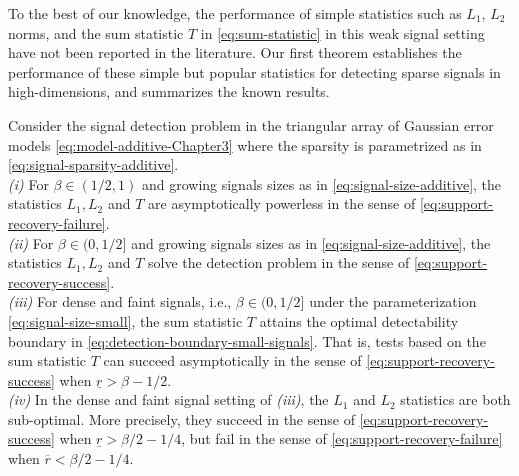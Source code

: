 To the best of our knowledge, the performance of simple statistics such as $L_1$, $L_2$ norms, and 
the sum statistic $T$ in \eqref{eq:sum-statistic} in this weak signal setting have not been reported in the literature. %
Our first theorem establishes the performance of these simple but popular statistics for detecting sparse signals 
in high-dimensions, and summarizes the known results.

\begin{theorem} \label{thm:detection-optimality}
Consider the signal detection problem in the triangular array of Gaussian error models \eqref{eq:model-additive-Chapter3} where the sparsity is parametrized as in \eqref{eq:signal-sparsity-additive}.\\

{\em (i)}  For $\beta \in (1/2,1)$ and growing signals sizes as in \eqref{eq:signal-size-additive}, the statistics
    $L_1, L_2$ and $T$ are asymptotically powerless in the sense of \eqref{eq:support-recovery-failure}.\\
    
{\em (ii)} For $\beta \in (0,1/2]$ and growing signals sizes as in \eqref{eq:signal-size-additive}, the statistics
    $L_1, L_2$ and $T$ solve the detection problem in the sense of \eqref{eq:support-recovery-success}.\\
    
{\em (iii)} For dense and faint signals, i.e., $\beta \in (0,1/2]$ under the parameterization \eqref{eq:signal-size-small}, the sum statistic $T$
    attains the optimal detectability boundary in \eqref{eq:detection-boundary-small-signals}.  That is, tests based on the sum statistic $T$ can 
    succeed asymptotically in the sense of \eqref{eq:support-recovery-success} when $\underline{r}>\beta-1/2$.\\
     
 {\em (iv)} In the dense and faint signal setting of {\em (iii)}, the $L_1$ and $L_2$ statistics are both 
 sub-optimal. More precisely, they succeed in the sense of  \eqref{eq:support-recovery-success} when $\underline{r}>\beta/2-{1}/{4}$, but fail in the 
 sense of \eqref{eq:support-recovery-failure} when $\overline{r}<\beta/2-{1}/{4}$.
\end{theorem}


